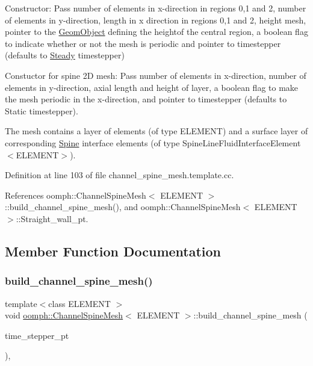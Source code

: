 Constructor\+: Pass number of elements in x-\/direction in regions 0,1 and 2, number of elements in y-\/direction, length in x direction in regions 0,1 and 2, height mesh, pointer to the \hyperlink{classoomph_1_1GeomObject}{Geom\+Object} defining the heightof the central region, a boolean flag to indicate whether or not the mesh is periodic and pointer to timestepper (defaults to \hyperlink{classoomph_1_1Steady}{Steady} timestepper) 

Constuctor for spine 2D mesh\+: Pass number of elements in x-\/direction, number of elements in y-\/direction, axial length and height of layer, a boolean flag to make the mesh periodic in the x-\/direction, and pointer to timestepper (defaults to Static timestepper).

The mesh contains a layer of elements (of type E\+L\+E\+M\+E\+NT) and a surface layer of corresponding \hyperlink{classoomph_1_1Spine}{Spine} interface elements (of type Spine\+Line\+Fluid\+Interface\+Element$<$\+E\+L\+E\+M\+E\+N\+T$>$). 

Definition at line 103 of file channel\+\_\+spine\+\_\+mesh.\+template.\+cc.



References oomph\+::\+Channel\+Spine\+Mesh$<$ E\+L\+E\+M\+E\+N\+T $>$\+::build\+\_\+channel\+\_\+spine\+\_\+mesh(), and oomph\+::\+Channel\+Spine\+Mesh$<$ E\+L\+E\+M\+E\+N\+T $>$\+::\+Straight\+\_\+wall\+\_\+pt.



\subsection{Member Function Documentation}
\mbox{\label{classoomph_1_1ChannelSpineMesh_a12eae5013f54ae04f9eb1cdffacf3955}} 
\subsubsection{\texorpdfstring{build\+\_\+channel\+\_\+spine\+\_\+mesh()}{build\_channel\_spine\_mesh()}}
{\footnotesize\ttfamily template$<$class E\+L\+E\+M\+E\+NT $>$ \\
void \hyperlink{classoomph_1_1ChannelSpineMesh}{oomph\+::\+Channel\+Spine\+Mesh}$<$ E\+L\+E\+M\+E\+NT $>$\+::build\+\_\+channel\+\_\+spine\+\_\+mesh (\begin{DoxyParamCaption}\item[{\hyperlink{classoomph_1_1TimeStepper}{Time\+Stepper} $\ast$}]{time\+\_\+stepper\+\_\+pt }\end{DoxyParamCaption})\hspace{0.3cm}{\ttfamily [protected]}, {\ttfamily [virtual]}}



